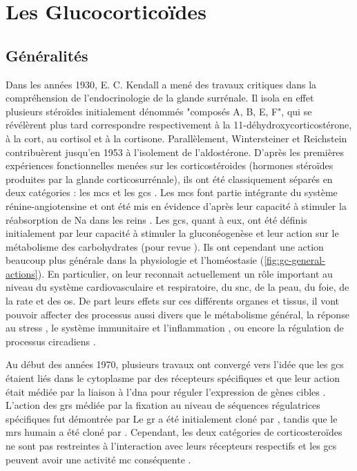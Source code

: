 \documentclass[../main.tex]{subfiles}
\begin{document}
\chapter{Les Glucocorticoïdes}


\section{Généralités}
Dans les années 1930, E. C. Kendall a mené des travaux critiques dans la compréhension de l'endocrinologie de la glande surrénale.
Il isola en effet plusieurs stéroïdes initialement dénommés "composés A, B, E, F", qui se révélèrent plus tard correspondre respectivement à la 11-déhydroxycorticostérone, à la \gls{cort}, au cortisol et à la cortisone.
Parallèlement, Wintersteiner et Reichstein contribuèrent jusqu'en 1953 à l'isolement de l'aldostérone.
D'après les premières expériences fonctionnelles menées sur les corticostéroides (hormones stéroïdes produites par la glande corticosurrénale), ils ont été classiquement séparés en deux catégories : les \glspl{mc} et les \glspl{gc} \citep{Simpson1952,Simpson1954}.
Les \glspl{mc} font partie intégrante du système rénine-angiotensine et ont été mis en évidence d'après leur capacité à stimuler la réabsorption de \gls{Na} dans les reins \citep{Gomez-Sanchez1996}.
Les \glspl{gc}, quant à eux, ont été définis initialement par leur capacité à stimuler la gluconéogenèse et leur action sur le métabolisme des carbohydrates (pour revue \citealp{McMahon1988}).
Ils ont cependant une action beaucoup plus générale dans la physiologie et l'homéostasie (\autoref{fig:gc-general-actions}).
En particulier, on leur reconnait actuellement un rôle important au niveau du système cardiovasculaire et respiratoire, du \gls{snc}, de la peau, du foie, de la rate et des os.
De part leurs effets sur ces différents organes et tissus, il vont pouvoir affecter des processus aussi divers que le métabolisme général, la réponse au stress \citep{Sapolsky2000}, le système immunitaire et l'inflammation \citep{Busillo2013}, ou encore la régulation de processus circadiens \citep{Dickmeis2009}.



Au début des années 1970, plusieurs travaux ont convergé vers l'idée que les \glspl{gc} étaient liés dans le cytoplasme par des récepteurs spécifiques \citep{Baxter1971,Rousseau1972} et que leur action était médiée par la liaison à l'\gls{dna} pour réguler l'expression de gènes cibles \citep{Baxter1972,Payvar1981}.
L'action des \glspl{gr} médiée par la fixation au niveau de séquences régulatrices spécifiques fut démontrée par \citet{Chandler1983,Karin1984,Slater1985}
Le \gls{gr} a été initialement cloné par \citet{Weinberger1985}, tandis que le \glspl{mr} humain a été cloné par \citet{Arriza1987}.
Cependant, les deux catégories de corticosteroïdes ne sont pas restreintes à l'interaction avec leurs récepteurs respectifs et les \glspl{gc} peuvent avoir une activité \gls{mc} conséquente \citep{Funder1973,Reul1990}.
\end{document}

